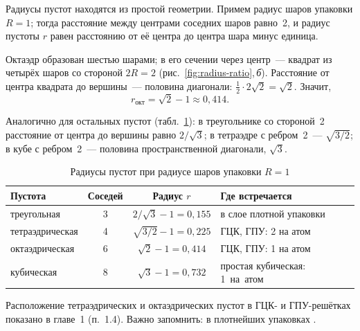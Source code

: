 Радиусы пустот находятся из простой геометрии. Примем радиус шаров
упаковки $R=1$; тогда расстояние между центрами соседних шаров равно~2,
и радиус пустоты $r$ равен расстоянию от её центра до центра шара минус
единица.

\begin{primer}
Октаэдр образован шестью шарами; в его сечении через центр~— квадрат из
четырёх шаров со стороной $2R=2$ (рис.~\ref{fig:radius-ratio},\,\textit{б}).
Расстояние от центра квадрата до вершины~— половина диагонали:
$\frac12\cdot2\sqrt2=\sqrt2$. Значит,
\[
r_\text{окт}=\sqrt2-1\approx0{,}414 .
\]
\end{primer}

Аналогично для остальных пустот (табл.~\ref{tab:voids}): в треугольнике
со стороной~2 расстояние от центра до вершины равно $2/\sqrt3$; в
тетраэдре с ребром~2~— $\sqrt{3/2}$; в кубе с ребром~2~— половина
пространственной диагонали, $\sqrt3$.

\begin{table}[ht]
\centering
\caption{Радиусы пустот при радиусе шаров упаковки $R=1$}
\label{tab:voids}
\small
\begin{tabular}{@{}lccl@{}}
\toprule
Пустота & Соседей & Радиус $r$ & Где встречается \\
\midrule
треугольная & 3 & $2/\sqrt3-1=0{,}155$ & в слое плотной упаковки \\
тетраэдрическая & 4 & $\sqrt{3/2}-1=0{,}225$ & ГЦК, ГПУ: 2 на атом \\
октаэдрическая & 6 & $\sqrt2-1=0{,}414$ & ГЦК, ГПУ: 1 на атом \\
кубическая & 8 & $\sqrt3-1=0{,}732$ & простая кубическая: 1~на~атом \\
\bottomrule
\end{tabular}
\end{table}

Расположение тетраэдрических и октаэдрических пустот в ГЦК- и
ГПУ-решётках показано в главе~1 (п.~1.4). Важно запомнить: в плотнейших
упаковках .


